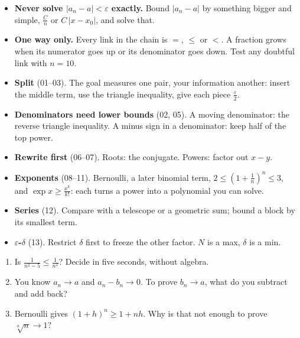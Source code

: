 \documentclass{kaelearn}
\newcommand\eps{\varepsilon}
\begin{document}
\begin{twominute}
\begin{itemize}
  \item \textbf{Never solve $|a_n-a|<\eps$ exactly.} Bound $|a_n-a|$ by something bigger and simple, $\frac Cn$ or
        $C\,|x-x_0|$, and solve that.
  \item \textbf{One way only.} Every link in the chain is $=$, $\le$ or $<$. A fraction grows when its numerator goes up or its
        denominator goes down. Test any doubtful link with $n=10$.
  \item \textbf{Split} (01--03). The goal measures one pair, your information another: insert the middle term, use the
        triangle inequality, give each piece $\frac\eps2$.
  \item \textbf{Denominators need lower bounds} (02, 05). A moving denominator: the reverse triangle inequality. A minus sign
        in a denominator: keep half of the top power.
  \item \textbf{Rewrite first} (06--07). Roots: the conjugate. Powers: factor out $x-y$.
  \item \textbf{Exponents} (08--11). Bernoulli, a later binomial term, \mbox{$2\le(1+\frac1n)^n\le3$}, and
        \mbox{$\exp x\ge\frac{x^k}{k!}$}: each turns a power into a polynomial you can solve.
  \item \textbf{Series} (12). Compare with a telescope or a geometric sum; bound a block by its smallest term.
  \item \textbf{$\eps$-$\delta$} (13). Restrict $\delta$ first to freeze the other factor. $N$ is a max, $\delta$ is a min.
\end{itemize}
\end{twominute}

\begin{guessfirst}
\begin{enumerate}
  \item Is $\frac1{n^2-5}\le\frac1{n^2}$? Decide in five seconds, without algebra.
  \item You know $a_n\to a$ and $a_n-b_n\to0$. To prove $b_n\to a$, what do you subtract and add back?
  \item Bernoulli gives $(1+h)^n\ge1+nh$. Why is that not enough to prove $\sqrt[n]n\to1$?
\end{enumerate}
\end{guessfirst}

\begin{terms}
\end{terms}
\end{document}
